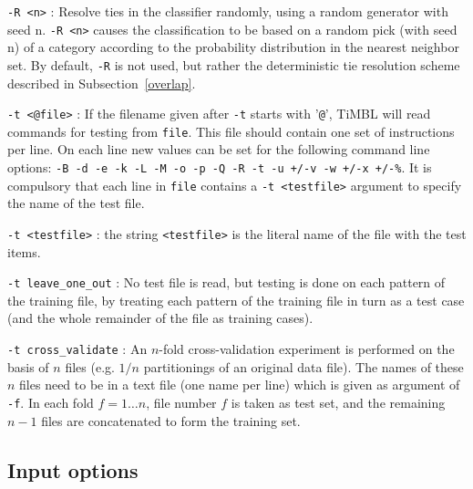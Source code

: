 \documentclass{report}
\begin{document}
\begin{description}
\item {\tt -R <n>} : Resolve ties in the classifier randomly, using a
random generator with seed n. {\tt -R <n>} causes the classification
to be based on a random pick (with seed n) of a category according to
the probability distribution in the nearest neighbor set. By default,
{\tt -R} is not used, but rather the deterministic tie resolution
scheme described in Subsection~\ref{overlap}.

\item {\tt -t <@file>} : If the filename given after {\tt -t} starts
with '{\tt @}', TiMBL will read commands for testing from {\tt file}.
This file should contain one set of instructions per line. On each
line new values can be set for the following command line options:
{\tt -B -d -e -k -L -M -o -p -Q -R -t -u +/-v -w +/-x +/-\%}. It is
compulsory that each line in {\tt file} contains a {\tt -t <testfile>}
argument to specify the name of the test file.

\item {\tt -t <testfile>} : the string {\tt <testfile>} is the literal name
of the file with the test items.

\item {\tt -t leave\_one\_out} : No test file is read, but testing is
done on each pattern of the training file, by treating each pattern of
the training file in turn as a test case (and the whole remainder of
the file as training cases).

\item {\tt -t cross\_validate} : An $n$-fold cross-validation
experiment is performed on the basis of $n$ files (e.g. $1/n$
partitionings of an original data file). The names of these $n$ files
need to be in a text file (one name per line) which is given as
argument of {\tt -f}. In each fold $f=1 \ldots n$, file number $f$ is
taken as test set, and the remaining $n-1$ files are concatenated to
form the training set.

\end{description}

\subsection{Input options}
\end{document}
